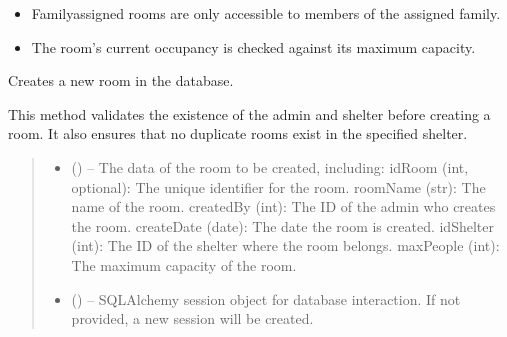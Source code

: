\documentclass[letterpaper,10pt,english]{sphinxmanual}
\begin{document}
\begin{fulllineitems}
\begin{fulllineitems}
\begin{itemize}
\item {} 
\sphinxAtStartPar
Family\sphinxhyphen{}assigned rooms are only accessible to members of the assigned family.

\item {} 
\sphinxAtStartPar
The room’s current occupancy is checked against its maximum capacity.

\end{itemize}

\end{fulllineitems}


\begin{fulllineitems}
\label{\detokenize{app.controllers:app.controllers.room_controller.RoomController.create_room}}
\pysigstartsignatures
\pysiglinewithargsret
{}
{\sphinxparamcomma {}}
{}
\pysigstopsignatures
\sphinxAtStartPar
Creates a new room in the database.

\sphinxAtStartPar
This method validates the existence of the admin and shelter before creating a room.
It also ensures that no duplicate rooms exist in the specified shelter.
\begin{quote}\begin{description}
\begin{itemize}
\item {} 
\sphinxAtStartPar
{} () – The data of the room to be created, including:
\sphinxhyphen{} idRoom (int, optional): The unique identifier for the room.
\sphinxhyphen{} roomName (str): The name of the room.
\sphinxhyphen{} createdBy (int): The ID of the admin who creates the room.
\sphinxhyphen{} createDate (date): The date the room is created.
\sphinxhyphen{} idShelter (int): The ID of the shelter where the room belongs.
\sphinxhyphen{} maxPeople (int): The maximum capacity of the room.

\item {} 
\sphinxAtStartPar
{} (\sphinxstyleliteralemphasis{\sphinxupquote{, }}) – SQLAlchemy session object for database interaction.
If not provided, a new session will be created.


\end{itemize}
\end{description}
\end{quote}
\end{fulllineitems}
\end{fulllineitems}
\end{document}
